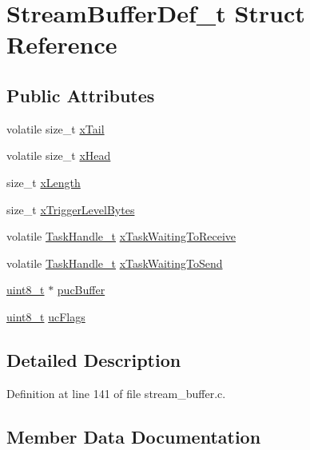 \hypertarget{structStreamBufferDef__t}{}\section{Stream\+Buffer\+Def\+\_\+t Struct Reference}
\label{structStreamBufferDef__t}
\subsection*{Public Attributes}
\begin{DoxyCompactItemize}
\item 
volatile size\+\_\+t \hyperlink{structStreamBufferDef__t_a937e441ed6c946a099d52b5955d7302c}{x\+Tail}
\item 
volatile size\+\_\+t \hyperlink{structStreamBufferDef__t_a75aafb9fdee8f0666837302bd9b12341}{x\+Head}
\item 
size\+\_\+t \hyperlink{structStreamBufferDef__t_a6eedf41c877edd42b3b460780d1b6555}{x\+Length}
\item 
size\+\_\+t \hyperlink{structStreamBufferDef__t_a4a7ee9b374cc0b358d049811def8d595}{x\+Trigger\+Level\+Bytes}
\item 
volatile \hyperlink{task_8h_a25b35e6e19ecf894173e7ff95edb96ef}{Task\+Handle\+\_\+t} \hyperlink{structStreamBufferDef__t_a8377ae8625121efa22d66e678add4057}{x\+Task\+Waiting\+To\+Receive}
\item 
volatile \hyperlink{task_8h_a25b35e6e19ecf894173e7ff95edb96ef}{Task\+Handle\+\_\+t} \hyperlink{structStreamBufferDef__t_a85b1cf05c0222f8d67a64f7d01722e52}{x\+Task\+Waiting\+To\+Send}
\item 
\hyperlink{stdint_8h_aba7bc1797add20fe3efdf37ced1182c5}{uint8\+\_\+t} $\ast$ \hyperlink{structStreamBufferDef__t_a4e05054a8a3d61a5cec0c18a70bbdb67}{puc\+Buffer}
\item 
\hyperlink{stdint_8h_aba7bc1797add20fe3efdf37ced1182c5}{uint8\+\_\+t} \hyperlink{structStreamBufferDef__t_a1afd02d997a1cb3149e3cf203c681d58}{uc\+Flags}
\end{DoxyCompactItemize}


\subsection{Detailed Description}


Definition at line 141 of file stream\+\_\+buffer.\+c.



\subsection{Member Data Documentation}
\mbox{\label{structStreamBufferDef__t_a4e05054a8a3d61a5cec0c18a70bbdb67}} 
